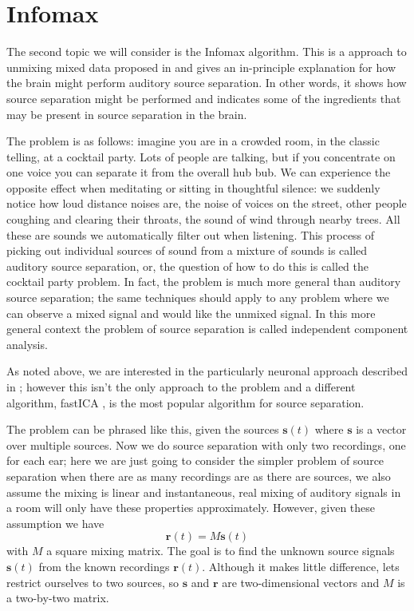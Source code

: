 \documentclass[12pt]{article}
\begin{document}
\section*{Infomax}

The second topic we will consider is the Infomax algorithm. This is a
approach to unmixing mixed data proposed in \cite{BellSejnowski1995}
and gives an in-principle explanation for how the brain might perform
auditory source separation. In other words, it shows how source
separation might be performed and indicates some of the ingredients
that may be present in source separation in the brain.

The problem is as follows: imagine you are in a crowded room, in the
classic telling, at a cocktail party. Lots of people are talking, but
if you concentrate on one voice you can separate it from the overall
hub bub. We can experience the opposite effect when meditating or
sitting in thoughtful silence: we suddenly notice how loud distance
noises are, the noise of voices on the street, other people coughing
and clearing their throats, the sound of wind through nearby
trees. All these are sounds we automatically filter out when
listening. This process of picking out individual sources of sound
from a mixture of sounds is called auditory source separation, or, the
question of how to do this is called the cocktail party problem. In
fact, the problem is much more general than auditory source
separation; the same techniques should apply to any problem where we
can observe a mixed signal and would like the unmixed signal. In this
more general context the problem of source separation is called
independent component analysis.

As noted above, we are interested in the particularly neuronal
approach described in \cite{BellSejnowski1995}; however this isn't the
only approach to the problem and a different algorithm, fastICA
\citep{Hyvarinen1999}, is the most popular algorithm for source separation.

The problem can be phrased like this, given the sources
$\textbf{s}(t)$ where $\textbf{s}$ is a vector over multiple
sources. Now we do source separation with only two recordings, one for
each ear; here we are just going to consider the simpler problem of
source separation when there are as many recordings are as there are
sources, we also assume the mixing is linear and instantaneous, real
mixing of auditory signals in a room will only have these properties
approximately. However, given these assumption we have
\begin{equation} \mathbf{r}(t)=M\mathbf{s}(t) \end{equation} with $M$
a square mixing matrix. The goal is to find the unknown source signals
$\textbf{s}(t)$ from the known recordings $\textbf{r}(t)$. Although it
makes little difference, lets restrict ourselves to two sources, so
$\mathbf{s}$ and $\mathbf{r}$ are two-dimensional vectors and $M$ is a
two-by-two matrix.
\end{document}
